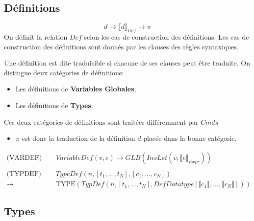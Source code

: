 \documentclass[
  12pt,
]{article}
\providecommand{\tightlist}{%
  \setlength{\itemsep}{0pt}\setlength{\parskip}{0pt}}
\begin{document}
\subsection{Définitions}\label{duxe9finitions}

\[  d \rightarrow \llbracket d \rrbracket_{Def} \rightarrow \pi \] On définit la relation
\(Def\) selon les cas de construction des définitions. Les cas de
construction des définitions sont donnés par les clauses des règles
syntaxiques.

Une définition est dite traduisible si chacune de ses clauses peut être
traduite. On distingue deux catégories de définitions:

\begin{itemize}
  \tightlist
  \item
        Les définitions de \textbf{Variables Globales},
  \item
        Les définitions de \textbf{Types}.
\end{itemize}

Ces deux catégories de définitions sont traitées différemment par \({Cmds}\)

\begin{itemize}
  \tightlist
  \item
        \(\pi\) est donc la traduction de la définition \(d\) placée dans la
        bonne catégorie.
\end{itemize}
\begin{align*}
  \text{(VARDEF)}
  \quad & VariableDef(v, e) \rightarrow  GLB(InsLet(v, \llbracket e \rrbracket_{Expr})) \\
  \\
  \text{(TYPDEF) } \quad    & TypeDef(n, [t_1,\dots,t_N], [c_1,\dots,c_N])          \\
  \rightarrow \;              & \text{TYPE}(TypDef(n, [t_1,\dots,t_N], DefDatatype[\llbracket c_1 \rrbracket,\dots,\llbracket c_N \rrbracket]))  
\end{align*}
\subsection{Types}\label{types-2}
\end{document}
